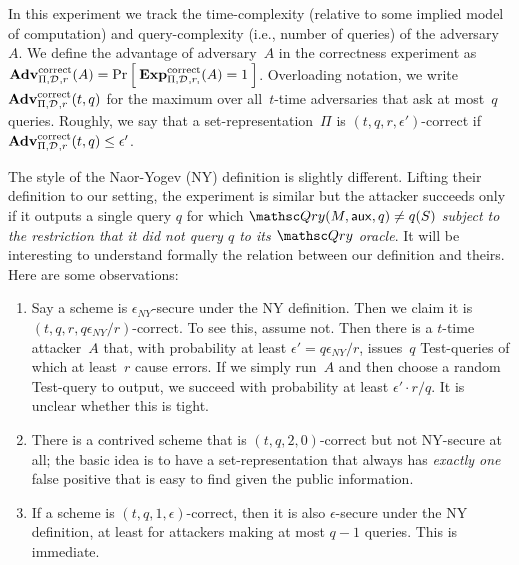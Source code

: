 In this experiment we track the time-complexity (relative to some
implied model of computation) and query-complexity (i.e., number of
queries) of the adversary~$A$.
We define the advantage of adversary~$A$ in the correctness experiment as
$\mathrm{\mathbf{Adv}}^{\mathrm{correct}}_{\Pi,\mathcal{D}_{}^{},r}(A) = \Pr\left[\: \mathrm{\mathbf{Exp}}^{\mathrm{correct}}_{\Pi,\mathcal{D}_{}^{}, r,}(A)=1 \:\right]$.
Overloading notation, we write $\mathrm{\mathbf{Adv}}^{\mathrm{correct}}_{\Pi,\mathcal{D}_{}^{},r}(t,q)$ for the maximum over all~$t$-time adversaries that ask at most~$q$ queries. Roughly, we say that a
set-representation~$\Pi$ is $(t,q,r,\epsilon')$-correct if $\mathrm{\mathbf{Adv}}^{\mathrm{correct}}_{\Pi,\mathcal{D}_{}^{},r}(t,q) \leq \epsilon'$.


The style of the Naor-Yogev (NY) definition is slightly different. 
Lifting their definition to our setting, the experiment is similar but the attacker
succeeds only if it outputs a single query $q$ for which $\Qry( M,
\aux, q) \neq q(S)$  \emph{subject to the restriction that it did not query $q$ to its $\Qry$ oracle}.
It will be interesting to understand formally the relation between our definition and theirs.
Here are some observations:
\begin{enumerate}
\item Say a scheme is $\epsilon_{NY}$-secure under the NY definition.
Then we claim it is $(t,q, r, q\epsilon_{NY}/r)$-correct. To see
this, assume not. Then there is a $t$-time attacker~$A$ that, with
probability at least $\epsilon'=q\epsilon_{NY}/r$,
issues~$q$ Test-queries of which at least~$r$ cause errors. If we simply run~$A$ and then choose a random Test-query to
output, we succeed with probability at least $\epsilon' \cdot r/q$. It is unclear whether this is tight.

\item There is a contrived scheme that is $(t, q, 2, 0)$-correct but not NY-secure at all; the basic idea is
to have a set-representation that always has \emph{exactly one} false positive that is easy to find
given the public information.

\item If a scheme is $(t,q,1,\epsilon)$-correct, then it is also $\epsilon$-secure under the NY definition,
at least for attackers making at most $q-1$ queries.
This is immediate.
\end{enumerate}



